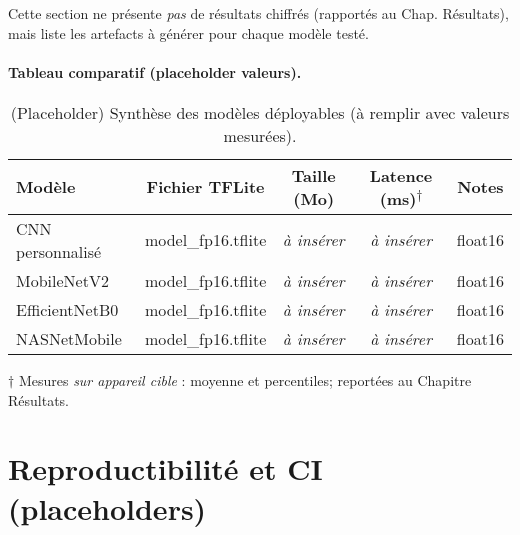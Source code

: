 Cette section ne présente \emph{pas} de résultats chiffrés (rapportés au Chap. Résultats), mais liste les artefacts à générer pour chaque modèle testé.


\paragraph{Tableau comparatif (placeholder valeurs).}
\begin{table}[h!]
\centering
\caption{(Placeholder) Synthèse des modèles déployables (à remplir avec valeurs mesurées).}
\label{tab:deploy_synthese}
\begin{tabular}{@{}lcccc@{}}
\toprule
Modèle & Fichier TFLite & Taille (Mo) & Latence (ms)\textsuperscript{$\dagger$} & Notes \\ \midrule
CNN personnalisé & model\_fp16.tflite & \textit{à insérer} & \textit{à insérer} & float16 \\
MobileNetV2      & model\_fp16.tflite & \textit{à insérer} & \textit{à insérer} & float16 \\
EfficientNetB0   & model\_fp16.tflite & \textit{à insérer} & \textit{à insérer} & float16 \\
NASNetMobile     & model\_fp16.tflite & \textit{à insérer} & \textit{à insérer} & float16 \\ \bottomrule
\end{tabular}

\begin{flushleft}
\footnotesize{$\dagger$ Mesures \emph{sur appareil cible} : moyenne et percentiles; reportées au Chapitre Résultats.}
\end{flushleft}
\end{table}

\section{Reproductibilité et CI (placeholders)}
\label{sec:ci_repro}

